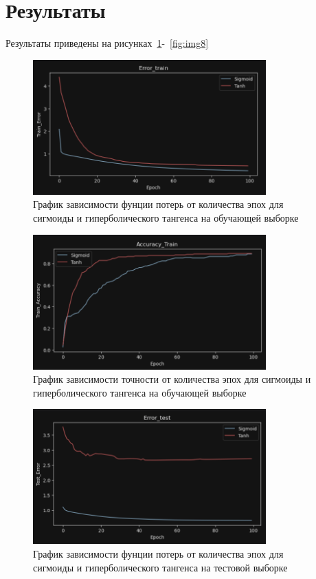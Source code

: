 \documentclass[a4paper, 14pt]{extarticle}
\begin{document}
\section{Результаты}

Результаты приведены на рисунках~\ref{fig:img1}-~\ref{fig:img8}

\begin{figure}[H]
\centering
\includegraphics[width=0.8\textwidth]{images/res1.png}
\caption{График зависимости фунции потерь от количества эпох для сигмоиды и гиперболического тангенса на обучающей выборке}
\label{fig:img1}
\end{figure}


\begin{figure}[H]
\centering
\includegraphics[width=0.8\textwidth]{images/res2.png}
\caption{График зависимости точности от количества эпох для сигмоиды и гиперболического тангенса на обучающей выборке}
\label{fig:img2}
\end{figure}


\begin{figure}[H]
\centering
\includegraphics[width=0.8\textwidth]{images/res3.png}
\caption{График зависимости фунции потерь от количества эпох для сигмоиды и гиперболического тангенса на тестовой выборке}
\label{fig:img3}
\end{figure}
\end{document}

